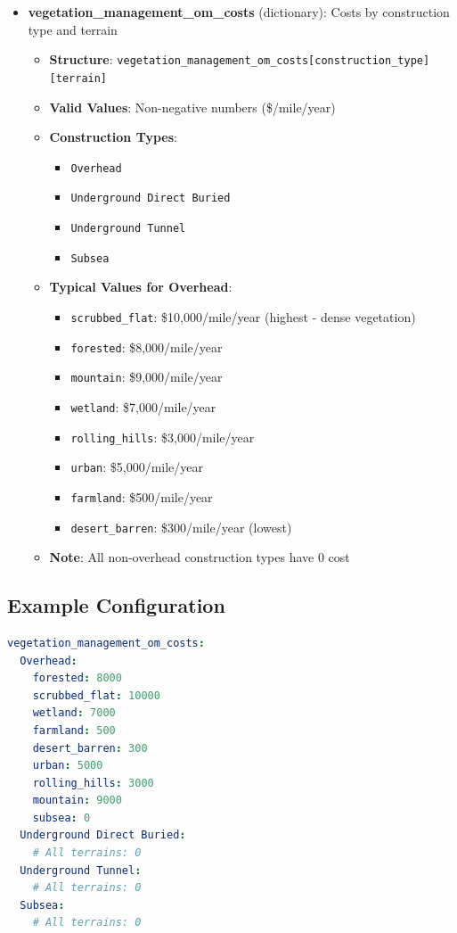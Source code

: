 \documentclass[ctcc_full_documentation.tex]{subfiles}
\begin{document}
\begin{itemize}
    \item \textbf{vegetation\_management\_om\_costs} (dictionary): Costs by construction type and terrain
    \begin{itemize}
        \item \textbf{Structure}: \texttt{vegetation\_management\_om\_costs[construction\_type][terrain]}
        \item \textbf{Valid Values}: Non-negative numbers (\$/mile/year)
        \item \textbf{Construction Types}:
        \begin{itemize}
            \item \texttt{Overhead}
            \item \texttt{Underground Direct Buried}
            \item \texttt{Underground Tunnel}
            \item \texttt{Subsea}
        \end{itemize}
        \item \textbf{Typical Values for Overhead}:
        \begin{itemize}
            \item \texttt{scrubbed\_flat}: \$10,000/mile/year (highest - dense vegetation)
            \item \texttt{forested}: \$8,000/mile/year
            \item \texttt{mountain}: \$9,000/mile/year
            \item \texttt{wetland}: \$7,000/mile/year
            \item \texttt{rolling\_hills}: \$3,000/mile/year
            \item \texttt{urban}: \$5,000/mile/year
            \item \texttt{farmland}: \$500/mile/year
            \item \texttt{desert\_barren}: \$300/mile/year (lowest)
        \end{itemize}
        \item \textbf{Note}: All non-overhead construction types have 0 cost
    \end{itemize}
\end{itemize}

\subsection{Example Configuration}

\begin{lstlisting}[language=yaml]
vegetation_management_om_costs:
  Overhead:
    forested: 8000
    scrubbed_flat: 10000
    wetland: 7000
    farmland: 500
    desert_barren: 300
    urban: 5000
    rolling_hills: 3000
    mountain: 9000
    subsea: 0
  Underground Direct Buried:
    # All terrains: 0
  Underground Tunnel:
    # All terrains: 0
  Subsea:
    # All terrains: 0
\end{lstlisting}
\end{document}
